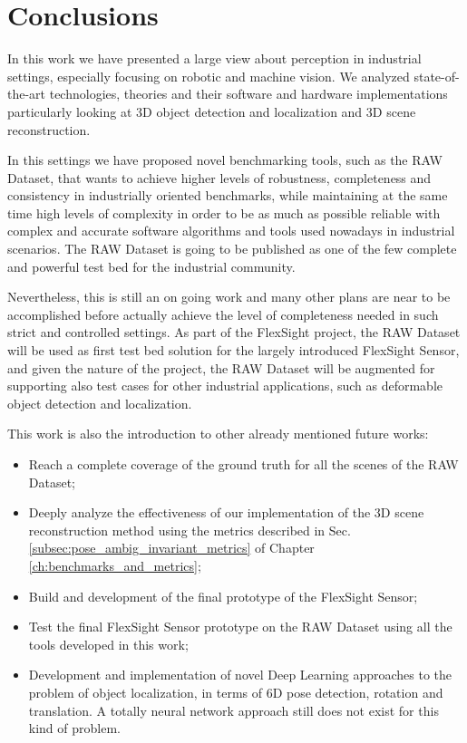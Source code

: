\chapter{Conclusions}\label{ch:conclusions}
In this work we have presented a large view about perception in industrial settings, especially focusing on robotic and machine vision. We analyzed state-of-the-art technologies, theories and their software and hardware implementations particularly looking at 3D object detection and localization and 3D scene reconstruction.

In this settings we have proposed novel benchmarking tools, such as the RAW Dataset, that wants to achieve higher levels of robustness, completeness and consistency in industrially oriented benchmarks, while maintaining at the same time high levels of complexity in order to be as much as possible reliable with complex and accurate software algorithms and tools used nowadays in industrial scenarios. The RAW Dataset is going to be published as one of the few complete and powerful test bed for the industrial community.

Nevertheless, this is still an on going work and many other plans are near to be accomplished before actually achieve the level of completeness needed in such strict and controlled settings. As part of the FlexSight project, the RAW Dataset will be used as first test bed solution for the largely introduced FlexSight Sensor, and given the nature of the project, the RAW Dataset will be augmented for supporting also test cases for other industrial applications, such as deformable object detection and localization.

This work is also the introduction to other already mentioned future works:

\begin{itemize}
	\item Reach a complete coverage of the ground truth for all the scenes of the RAW Dataset;
	\item Deeply analyze the effectiveness of our implementation of the 3D scene reconstruction method using the metrics described in Sec. \ref{subsec:pose_ambig_invariant_metrics} of Chapter \ref{ch:benchmarks_and_metrics};
	\item Build and development of the final prototype of the FlexSight Sensor;
	\item Test the final FlexSight Sensor prototype on the RAW Dataset using all the tools developed in this work;
	\item Development and implementation of novel Deep Learning approaches to the problem of object localization, in terms of 6D pose detection, rotation and translation. A totally neural network approach still does not exist for this kind of problem.
\end{itemize}

